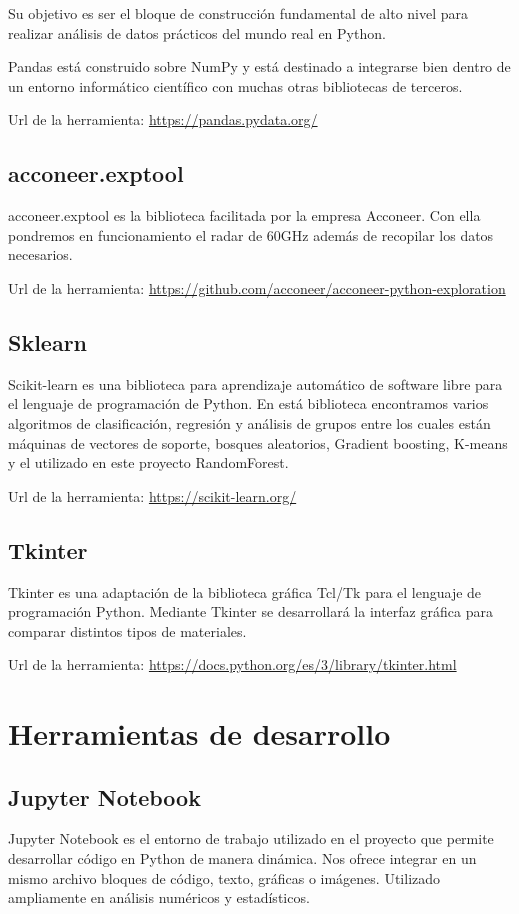 Su objetivo es ser el bloque de construcción fundamental de alto nivel para realizar análisis de datos prácticos del mundo real en Python.

Pandas está construido sobre NumPy y está destinado a integrarse bien dentro de un entorno informático científico con muchas otras bibliotecas de terceros.

Url de la herramienta: \url{https://pandas.pydata.org/}

\subsection{acconeer.exptool}
acconeer.exptool es la biblioteca facilitada por la empresa Acconeer. Con ella pondremos en funcionamiento el radar de 60GHz además de recopilar los datos necesarios.

Url de la herramienta: \url{https://github.com/acconeer/acconeer-python-exploration}


\subsection{Sklearn}
Scikit-learn es una biblioteca para aprendizaje automático de software libre para el lenguaje de programación de Python.
En está biblioteca encontramos varios algoritmos de clasificación, regresión y análisis de grupos entre los cuales están máquinas de vectores de soporte, bosques aleatorios, Gradient boosting, K-means y el utilizado en este proyecto RandomForest.

Url de la herramienta: \url{https://scikit-learn.org/}

\subsection{Tkinter}
Tkinter es una adaptación de la biblioteca gráfica Tcl/Tk \cite{Tcl} para el lenguaje de programación Python. Mediante Tkinter se desarrollará la interfaz gráfica para comparar distintos tipos de materiales.

Url de la herramienta: \url{https://docs.python.org/es/3/library/tkinter.html}

\section{Herramientas de desarrollo}
\subsection{Jupyter Notebook}
Jupyter Notebook es el entorno de trabajo utilizado en el proyecto que permite desarrollar código en Python de manera dinámica. Nos ofrece integrar en un mismo archivo bloques de código, texto, gráficas o imágenes. Utilizado ampliamente en análisis numéricos y estadísticos.


